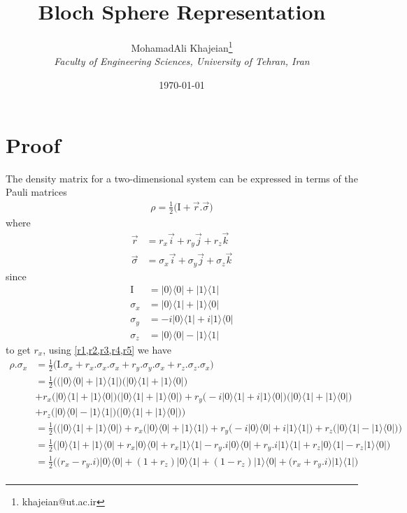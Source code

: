 \documentclass{article}
\title{\textbf{Bloch Sphere Representation}}
\author{
    MohamadAli Khajeian\footnote{khajeian@ut.ac.ir} \\ 
    \small \textit{Faculty of Engineering Sciences, University of Tehran, Iran} \\ 
}
\date{\today}
\newcommand{\op}[2]{|#1\rangle \langle#2|}
\begin{document}
\maketitle


\section*{Proof}
The density matrix for a two-dimensional system can be expressed in terms of the Pauli matrices
\begin{align}
    \rho = \frac{1}{2}\big(\text{I} + \vec{r}.\vec{\sigma}\big)
    \label{r1}
\end{align}
where
\begin{align*}
    \vec{r} &= r_x \vec{i} + r_y \vec{j} + r_z \vec{k} \\
    \vec{\sigma} &= \sigma_x \vec{i} + \sigma_y \vec{j} + \sigma_z \vec{k}
\end{align*}
since 
\begin{align}
    \text{I} &= \op{0}{0} + \op{1}{1} \label{r2}\\
    \sigma_x &= \op{0}{1} + \op{1}{0} \label{r3}\\ 
    \sigma_y &= -i\op{0}{1} + i\op{1}{0} \label{r4}\\ 
    \sigma_z &= \op{0}{0} - \op{1}{1} \label{r5}
\end{align}
to get $r_x$, using \cref{r1,r2,r3,r4,r5} we have
\begin{align*}
    \rho.\sigma_{x} &= \frac{1}{2}\big(\text{I}.\sigma_{x} + r_x.\sigma_x.\sigma_x + r_y.\sigma_y.\sigma_x + r_z.\sigma_z.\sigma_x \big) \\
    &= \frac{1}{2}\bigg(\big(\op{0}{0} + \op{1}{1}\big)\big(\op{0}{1} + \op{1}{0}\big) \\
    &+ r_x\big(\op{0}{1} + \op{1}{0}\big)\big(\op{0}{1} + \op{1}{0}\big) + r_y\big(-i\op{0}{1} + i\op{1}{0}\big)\big(\op{0}{1} + \op{1}{0}\big) \\
    &+ r_z\big(\op{0}{0} - \op{1}{1}\big)\big(\op{0}{1} + \op{1}{0}\big)\bigg) \\
    &= \frac{1}{2}\bigg(\big(\op{0}{1} + \op{1}{0}\big) + r_x\big(\op{0}{0} + \op{1}{1}\big) + r_y\big(-i\op{0}{0} + i \op{1}{1}\big) + r_z\big(\op{0}{1} - \op{1}{0}\big)\bigg) \\
    &= \frac{1}{2}\bigg(\op{0}{1} + \op{1}{0} + r_x\op{0}{0} + r_x\op{1}{1} - r_y.i\op{0}{0} + r_y.i\op{1}{1} + r_z\op{0}{1} - r_z\op{1}{0}\bigg) \\
    &= \frac{1}{2}\bigg(\big( r_x - r_y.i \big)\op{0}{0} + (1 + r_z)\op{0}{1} + (1 - r_z)\op{1}{0} + \big( r_x + r_y.i \big)\op{1}{1}\bigg) \\
\end{align*}
\end{document}
